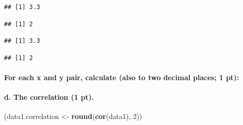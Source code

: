 \documentclass[]{article}
\newenvironment{Shaded}{\begin{snugshade}}{\end{snugshade}}
\newcommand{\KeywordTok}[1]{\textcolor[rgb]{0.13,0.29,0.53}{\textbf{#1}}}
\newcommand{\DecValTok}[1]{\textcolor[rgb]{0.00,0.00,0.81}{#1}}
\newcommand{\StringTok}[1]{\textcolor[rgb]{0.31,0.60,0.02}{#1}}
\newcommand{\OperatorTok}[1]{\textcolor[rgb]{0.81,0.36,0.00}{\textbf{#1}}}
\newcommand{\NormalTok}[1]{#1}
\let\oldparagraph\paragraph
\renewcommand{\paragraph}[1]{\oldparagraph{#1}\mbox{}}
\begin{document}
\begin{verbatim}
## [1] 3.3
\end{verbatim}

\begin{Shaded}
\end{Shaded}

\begin{verbatim}
## [1] 2
\end{verbatim}

\begin{Shaded}
\end{Shaded}

\begin{verbatim}
## [1] 3.3
\end{verbatim}

\begin{Shaded}
\end{Shaded}

\begin{verbatim}
## [1] 2
\end{verbatim}

\paragraph{For each x and y pair, calculate (also to two decimal places;
1
pt):}\label{for-each-x-and-y-pair-calculate-also-to-two-decimal-places-1-pt}

\paragraph{d. The correlation (1 pt).}\label{d.-the-correlation-1-pt.}

\begin{Shaded}
\begin{Highlighting}[]
\NormalTok{(data1.correlation <-}\StringTok{ }\KeywordTok{round}\NormalTok{(}\KeywordTok{cor}\NormalTok{(data1), }\DecValTok{2}\NormalTok{))}
\end{Highlighting}
\end{Shaded}
\end{document}
